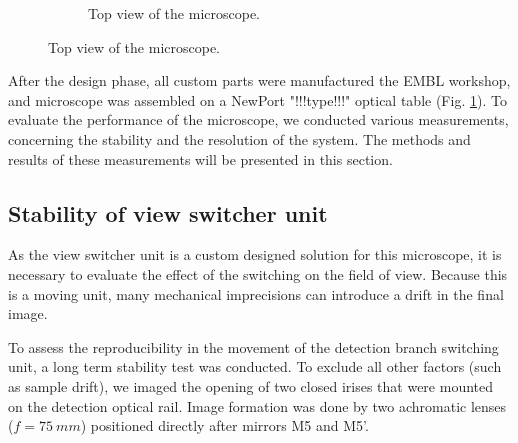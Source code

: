 \begin{figure}
\begin{subfigure}[t]{1\textwidth}
      \caption{Top view of the microscope.}
    \end{subfigure}
    \label{fig:frontView}
  \end{figure}


  After the design phase, all custom parts were manufactured the EMBL workshop, and microscope was assembled on a NewPort "!!!type!!!" optical table (Fig. \ref{fig:frontView}). To evaluate the performance of the microscope, we conducted various measurements, concerning the stability and the resolution of the system. The methods and results of these measurements will be presented in this section.


  \subsection{Stability of view switcher unit}
    \label{sec:mirrorStability}
    As the view switcher unit is a custom designed solution for this microscope, it is necessary to evaluate the effect of the switching on the field of view. Because this is a moving unit, many mechanical imprecisions can introduce a drift in the final image. 

    To assess the reproducibility in the movement of the detection branch switching unit, a long term stability test was conducted. To exclude all other factors (such as sample drift), we imaged the opening of two closed irises that were mounted on the detection optical rail. Image formation was done by two achromatic lenses ($f=\SI{75}{mm}$) positioned directly after mirrors M5 and M5'.
    

